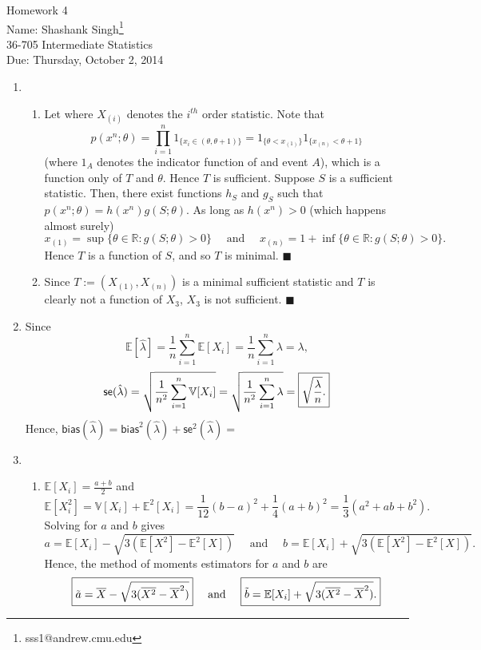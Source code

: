 \documentclass[11pt]{article}
\makeatletter
\newcommand{\myname}{Shashank Singh\footnote{sss1@andrew.cmu.edu}}
\newcommand{\myclass}{36-705 Intermediate Statistics}
\newcommand{\myhwnum}{4}
\newcommand{\duedate}{Thursday, October 2, 2014}
\renewcommand{\qed}{\quad \ensuremath{\blacksquare}}
\newcommand{\E}{\mathbb{E}} %
\newcommand{\Var}{\mathbb{V}} %
\newcommand{\R}{\mathbb{R}} %
\newcommand{\ol}{\overline}
\makeatother
\begin{document}
\thispagestyle{plain}

{\Large Homework \myhwnum} \\
Name: \myname \\
\myclass \\
Due: \duedate

\begin{enumerate}
\item
\begin{enumerate}
\item Let  where $X_{(i)}$ denotes the
$i^{th}$ order statistic. Note that
\[p(x^n; \theta)
    = \prod_{i = 1}^n 1_{\{x_i \in (\theta, \theta + 1)\}}
    = 1_{\{\theta < x_{(1)}\}}1_{\{x_{(n)} < \theta + 1\}}
\]
(where $1_A$ denotes the indicator function of and event $A$), which is a
function only of $T$ and $\theta$. Hence $T$ is sufficient. Suppose $S$ is a
sufficient statistic. Then, there exist functions $h_S$ and $g_S$ such that
$p(x^{n}; \theta) = h(x^n)g(S;\theta)$. As long as $h(x^n) > 0$ (which happens
almost surely)
\[x_{(1)}
    = \sup \{\theta \in \R : g(S;\theta) > 0\}
    \quad \mbox{ and } \quad
    x_{(n)} = 1 + \inf\{\theta \in \R : g(S; \theta) > 0\}.
\]
Hence $T$ is a function of $S$, and so $T$ is minimal. \qed

\item Since $T := (X_{(1)}, X_{(n)})$ is a minimal sufficient statistic and $T$
is clearly not a function of $X_3$, $X_3$ is not sufficient. \qed

\end{enumerate}

\item Since
\[\E[\hat\lambda]
    = \frac{1}{n} \sum_{i = 1}^n \E[X_i]
    = \frac{1}{n} \sum_{i = 1}^n \lambda
    = \lambda,
\]
\[\mathsf{se}(\hat\lambda)
    = \sqrt{\frac{1}{n^2} \sum_{i = 1}^n \Var [X_i]}
    = \sqrt{\frac{1}{n^2} \sum_{i = 1}^n \lambda}
    = \mbox{\fbox{$\displaystyle \sqrt{\frac{\lambda}{n}}$.}}
\]
Hence,
$\mathsf{bias}(\hat\lambda)
    = \mathsf{bias}^2(\hat\lambda) + \mathsf{se}^2(\hat\lambda)
    = $

\newpage
\item
\begin{enumerate}
\item $\E[X_i] = \frac{a + b}{2}$ and
\[\E[X_i^2]
    = \Var[X_i] + \E^2[X_i]
    = \frac{1}{12}(b - a)^2 + \frac{1}{4}(a + b)^2
    = \frac{1}{3}(a^2 + ab + b^2).\]
Solving for $a$ and $b$ gives
\[a = \E[X_i] - \sqrt{3(\E[X^2] - \E^2[X])}
    \quad \mbox{ and } \quad
    b = \E[X_i] + \sqrt{3(\E[X^2] - \E^2[X])}.
\]
Hence, the method of moments estimators for $a$ and $b$ are
\[\mbox{\fbox{$\displaystyle
    \tilde a = \ol X - \sqrt{3(\ol{X^2} - \ol{X}^2)}$}}
    \quad \mbox{ and } \quad
    \mbox{\fbox{$\displaystyle
    \tilde b = \E[X_i] + \sqrt{3(\ol{X^2} - \ol{X}^2)}$.}}
\]


\end{enumerate}
\end{enumerate}
\end{document}
